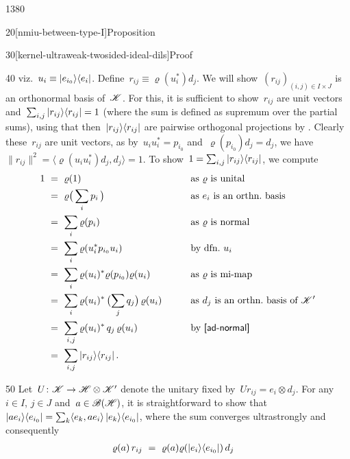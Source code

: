 \begin{parsec}{1380}
\begin{point}{20}[nmiu-between-type-I]{Proposition}
\begin{point}{30}[kernel-ultraweak-twosided-ideal-dils]{Proof}
\begin{point}{40}
                viz.~$u_i \equiv \left|e_{i_0}\right>\!\left<e_i\right|$.
    Define~$r_{ij} \equiv \varrho(u_i^*) d_j$.
We will show~$(r_{ij})_{(i,j) \in I\times J}$ is an orthonormal
    basis of~$\mathscr{K}$.
For this, it is sufficient to
    show~$r_{ij}$ are unit vectors
    and~$\sum_{i,j} \left|r_{ij}\right>\!\left<r_{ij}\right| = 1$
    (where the sum is defined as supremum over the partial sums),
    using that then~$\left|r_{ij}\right>\!\left<r_{ij}\right|$
        are pairwise orthogonal projections
        by .
Clearly these~$r_{ij}$ are unit vectors,
     as by~$u_iu_i^* = p_{i_0}$
        and~$\varrho(p_{i_0}) d_j = d_j$,
        we have~$\|r_{ij}\|^2 = \langle \varrho(u_i u_i^*) d_j,d_j\rangle = 1$.
To show~$1 = \sum_{i,j} \left|r_{ij}\right>\!\left<r_{ij}\right|$, we compute
\begingroup\allowdisplaybreaks
    \begin{alignat*}{2}
    1 
    & \ = \  \varrho(1)
            &\qquad&\text{as $\varrho$ is unital} \\
    & \ = \  \varrho\bigl( \,\sum_i p_i \,\bigr)
            &&\text{as $e_i$ is an orthn.~basis}\\
        & \ = \  \sum_i \varrho(p_i) &&\text{as $\varrho$ is normal}\\
        & \ = \  \sum_i \varrho(u_i^* p_{i_0} u_i) && \text{by dfn.~$u_i$}\\
    & \ = \  \sum_i \varrho(u_i)^* \varrho(p_{i_0}) \varrho(u_i) 
            && \text{as~$\varrho$ is mi-map}\\
    & \ = \  \sum_i \varrho(u_i)^* \,\bigl( \sum_j q_j \bigr) \, \varrho(u_i)
            && \text{as $d_j$ is an orthn.~basis of~$\scrK'$}
        \\
    & \ = \  \sum_{i,j} \varrho(u_i)^*  \,q_j\, \varrho(u_i) 
            && \text{by \sref{ad-normal}}\\
        & \ = \  \sum_{i,j} \ketbra{r_{ij}}{r_{ij}}.
\end{alignat*}
\endgroup
\end{point}
\begin{point}{50}%
Let~$U \colon \mathscr{K} \to \mathscr{H} \otimes \mathscr{K}'$
    denote the unitary fixed by~$U r_{ij} = e_i \otimes d_j$.
For any~$i\in I$, $j \in J$ and~$a\in\mathscr{B}(\mathscr{H})$,
    it is straightforward to show that~$\left|a e_i\right>\!\left<e_{i_0}\right|
                    = \sum_k \langle e_k, ae_i \rangle \left|e_k\right>\!\left<e_{i_0}\right|$,
        where the sum converges ultrastrongly
        and consequently
\begingroup\allowdisplaybreaks
\begin{align*}
    \varrho(a)\, r_{ij}
        & \ = \ \varrho(a) \varrho(\ketbra{e_i}{e_{i_0}}) \,d_j 

\end{align*}
\end{point}
\end{point}
\end{point}
\end{parsec}
